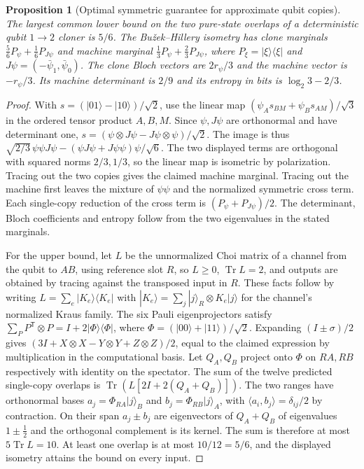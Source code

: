 \documentclass[aps,pra,onecolumn,superscriptaddress,nofootinbib,10pt]{revtex4-2}
\newtheorem{proposition}[theorem]{Proposition}
\theoremstyle{definition}
\theoremstyle{remark}
\begin{document}
\begin{proposition}[Optimal symmetric guarantee for approximate qubit copies]\label{cp:approxclone}
The largest common lower bound on the two pure-state overlaps of a deterministic qubit $1\to2$ cloner is $5/6$. The Bu\v zek--Hillery isometry has clone marginals $\tfrac56 P_\psi+\tfrac16 P_{J\psi}$ and machine marginal $\tfrac13 P_\psi+\tfrac23 P_{J\psi}$, where $P_\xi=|\xi\rangle\langle\xi|$ and $J\psi=(-\bar\psi_1,\bar\psi_0)$. The clone Bloch vectors are $2r_\psi/3$ and the machine vector is $-r_\psi/3$. Its machine determinant is $2/9$ and its entropy in bits is $\log_2 3-2/3$. \cite{n4:BH,n4:GM}
\end{proposition}
\begin{proof}
With $s=(|01\rangle-|10\rangle)/\sqrt2$, use the linear map
$(\psi_A s_{BM}+\psi_B s_{AM})/\sqrt3$ in the ordered tensor product $A,B,M$. Since $\psi,J\psi$ are orthonormal and have determinant one, $s=(\psi\otimes J\psi-J\psi\otimes\psi)/\sqrt2$. The image is thus
$\sqrt{2/3}\,\psi\psi J\psi-(\psi J\psi+J\psi\psi)\psi/\sqrt6$.
The two displayed terms are orthogonal with squared norms $2/3,1/3$, so the linear map is isometric by polarization. Tracing out the two copies gives the claimed machine marginal. Tracing out the machine first leaves the mixture of $\psi\psi$ and the normalized symmetric cross term. Each single-copy reduction of the cross term is $(P_\psi+P_{J\psi})/2$. The determinant, Bloch coefficients and entropy follow from the two eigenvalues in the stated marginals.

For the upper bound, let $L$ be the unnormalized Choi matrix of a channel from the qubit to $AB$, using reference slot $R$, so $L\ge0$, $\operatorname{Tr}L=2$, and outputs are obtained by tracing against the transposed input in $R$. These facts follow by writing $L=\sum_e |K_e\rangle\langle K_e|$ with $|K_e\rangle=\sum_j |j\rangle_R\otimes K_e|j\rangle$ for the channel's normalized Kraus family. The six Pauli eigenprojectors satisfy
$\sum_P P^{\mathsf T}\otimes P=I+2|\Phi\rangle\langle\Phi|$, where $\Phi=(|00\rangle+|11\rangle)/\sqrt2$. Expanding $(I\pm\sigma)/2$ gives $(3I+X\otimes X-Y\otimes Y+Z\otimes Z)/2$, equal to the claimed expression by multiplication in the computational basis. Let $Q_A,Q_B$ project onto $\Phi$ on $RA,RB$ respectively with identity on the spectator. The sum of the twelve predicted single-copy overlaps is $\operatorname{Tr}(L[2I+2(Q_A+Q_B)])$. The two ranges have orthonormal bases $a_j=\Phi_{RA}|j\rangle_B$ and $b_j=\Phi_{RB}|j\rangle_A$, with $\langle a_i,b_j\rangle=\delta_{ij}/2$ by contraction. On their span $a_j\pm b_j$ are eigenvectors of $Q_A+Q_B$ of eigenvalues $1\pm\tfrac12$ and the orthogonal complement is its kernel. The sum is therefore at most $5\operatorname{Tr}L=10$. At least one overlap is at most $10/12=5/6$, and the displayed isometry attains the bound on every input.
\end{proof}
\end{document}
